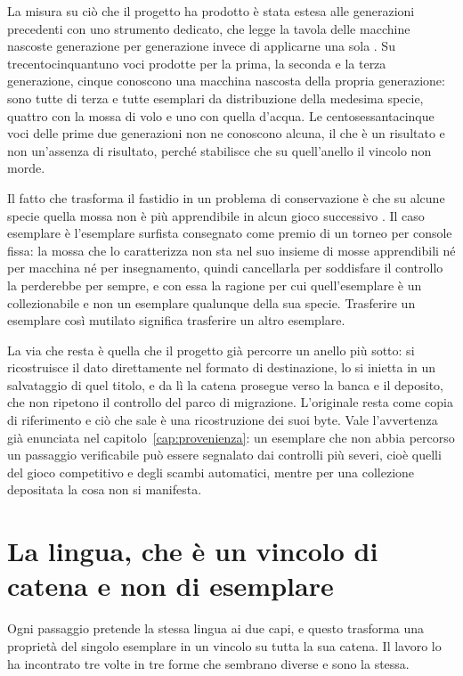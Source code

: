 La misura su ciò che il progetto ha prodotto è stata estesa alle generazioni precedenti con uno strumento dedicato, che legge la tavola delle macchine nascoste generazione per generazione invece di applicarne una sola \cite{bulbapedia-macchine-nascoste}. Su trecentocinquantuno voci prodotte per la prima, la seconda e la terza generazione, cinque conoscono una macchina nascosta della propria generazione: sono tutte di terza e tutte esemplari da distribuzione della medesima specie, quattro con la mossa di volo e uno con quella d'acqua. Le centosessantacinque voci delle prime due generazioni non ne conoscono alcuna, il che è un risultato e non un'assenza di risultato, perché stabilisce che su quell'anello il vincolo non morde.

Il fatto che trasforma il fastidio in un problema di conservazione è che su alcune specie quella mossa non è più apprendibile in alcun gioco successivo \cite{surfing-pikachu}. Il caso esemplare è l'esemplare surfista consegnato come premio di un torneo per console fissa: la mossa che lo caratterizza non sta nel suo insieme di mosse apprendibili né per macchina né per insegnamento, quindi cancellarla per soddisfare il controllo la perderebbe per sempre, e con essa la ragione per cui quell'esemplare è un collezionabile e non un esemplare qualunque della sua specie. Trasferire un esemplare così mutilato significa trasferire un altro esemplare.

La via che resta è quella che il progetto già percorre un anello più sotto: si ricostruisce il dato direttamente nel formato di destinazione, lo si inietta in un salvataggio di quel titolo, e da lì la catena prosegue verso la banca e il deposito, che non ripetono il controllo del parco di migrazione. L'originale resta come copia di riferimento e ciò che sale è una ricostruzione dei suoi byte. Vale l'avvertenza già enunciata nel capitolo~\ref{cap:provenienza}: un esemplare che non abbia percorso un passaggio verificabile può essere segnalato dai controlli più severi, cioè quelli del gioco competitivo e degli scambi automatici, mentre per una collezione depositata la cosa non si manifesta.

\section{La lingua, che è un vincolo di catena e non di esemplare}

Ogni passaggio pretende la stessa lingua ai due capi, e questo trasforma una proprietà del singolo esemplare in un vincolo su tutta la sua catena. Il lavoro lo ha incontrato tre volte in tre forme che sembrano diverse e sono la stessa.

